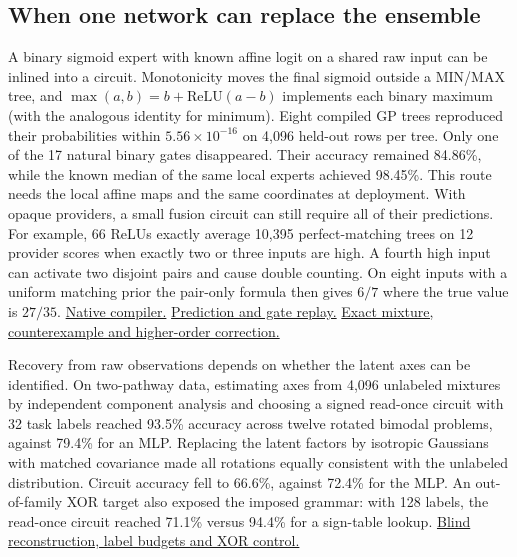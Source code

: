 \subsection{When one network can replace the ensemble}

A binary sigmoid expert with known affine logit on a shared raw input can be
inlined into a circuit. Monotonicity moves the final sigmoid outside a MIN/MAX
tree, and $\max(a,b)=b+\mathrm{ReLU}(a-b)$ implements each binary maximum
(with the analogous identity for minimum). Eight compiled GP trees reproduced
their probabilities within $5.56\times10^{-16}$ on 4,096 held-out rows per
tree. Only one of the 17 natural binary gates disappeared. Their accuracy
remained 84.86\%, while the known median of the same local experts achieved
98.45\%. This route needs the local affine maps and the same coordinates at
deployment. With opaque providers, a small fusion circuit can still require
all of their predictions. For example, 66 ReLUs exactly average 10,395
perfect-matching trees on 12 provider scores when exactly two or three
inputs are high. A fourth high input can activate two disjoint pairs and
cause double counting. On eight inputs with a uniform matching prior the
pair-only formula then gives $6/7$ where the true value is $27/35$.
\href{https://github.com/damiankucharski/OKAPI/blob/35ca8e6/okapi/lattice.py}{Native compiler.}
\href{https://github.com/damiankucharski/fusionbench/blob/d10b51e/docs/ensemble-study/lattice-compile/README.md}{Prediction and gate replay.}
\href{https://github.com/damiankucharski/fusionbench/blob/8f0ba19/docs/ensemble-study/search-regret/matching-compression/README.md}{Exact mixture, counterexample and higher-order correction.}

Recovery from raw observations depends on whether the latent axes can be identified. On
two-pathway data, estimating axes from 4,096 unlabeled mixtures by independent
component analysis and choosing a signed read-once circuit with 32 task
labels reached 93.5\% accuracy across twelve rotated bimodal problems,
against 79.4\% for an MLP. Replacing the latent factors by isotropic Gaussians
with matched covariance made all rotations equally consistent with the unlabeled distribution. Circuit
accuracy fell to 66.6\%, against 72.4\% for the MLP. An out-of-family XOR target also exposed the imposed grammar: with 128
labels, the read-once circuit reached 71.1\% versus 94.4\% for a sign-table
lookup.
\href{https://github.com/damiankucharski/fusionbench/blob/55de703/docs/ensemble-study/README.md}{Blind reconstruction, label budgets and XOR control.}

